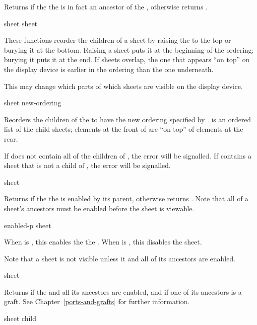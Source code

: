 Returns  if the the   is in fact
an ancestor of the  , otherwise returns .

 {sheet}
  {sheet}

These functions reorder the children of a sheet by raising the 
 to the top or burying it at the bottom.  Raising a sheet puts it at
the beginning of the ordering; burying it puts it at the end.  If sheets
overlap, the one that appears ``on top'' on the display device is earlier in the
ordering than the one underneath.

This may change which parts of which sheets are visible on the display device.

 {sheet new-ordering}

Reorders the children of the   to have the new ordering
specified by .   is an ordered list of the
child sheets; elements at the front of  are ``on top'' of
elements at the rear.

If  does not contain all of the children of , the
 error will be signalled.  If
 contains a sheet that is not a child of , the
 error will be signalled.

 {sheet}

Returns  if the the   is enabled by its
parent, otherwise returns .  Note that all of a sheet's ancestors
must be enabled before the sheet is viewable.

 {enabled-p sheet}

When  is , this enables the the 
.  When  is , this disables the sheet.

Note that a sheet is not visible unless it and all of its ancestors are enabled.


 {sheet}

Returns  if the   and all its ancestors are
enabled, and if one of its ancestors is a graft.  See
Chapter~\ref{ports-and-grafts} for further information.

 {sheet child}

